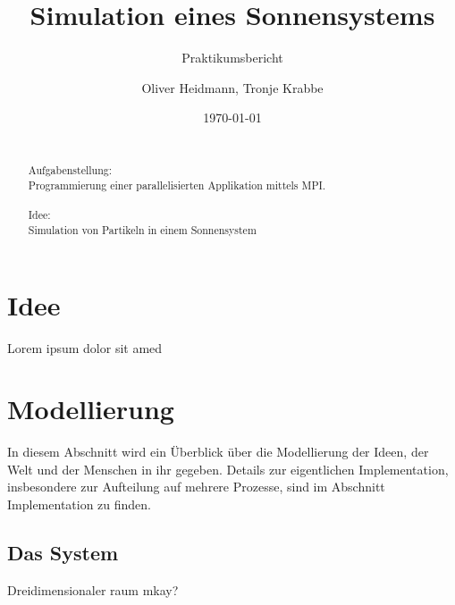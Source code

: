 \title{Simulation eines Sonnensystems}
\subtitle{Praktikumsbericht}

\author{Oliver Heidmann, Tronje Krabbe}

  
\date{\today}

\maketitle

\newpage
\begin{abstract}
\quad \\
Aufgabenstellung: \\
Programmierung einer parallelisierten Applikation mittels MPI. \\ \\
Idee: \\
Simulation von Partikeln in einem Sonnensystem
\end{abstract}

\tableofcontents
\newpage
\section{Idee}
Lorem ipsum dolor sit amed

\section{Modellierung}
In diesem Abschnitt wird ein Überblick über die Modellierung der Ideen, der Welt und der Menschen in ihr gegeben. 
Details zur eigentlichen Implementation, insbesondere zur Aufteilung auf mehrere Prozesse, sind im Abschnitt Implementation zu finden.
\subsection{Das System}
\begin{minipage}[t]{0.48\textwidth}
    Dreidimensionaler raum mkay?
\end{minipage}

